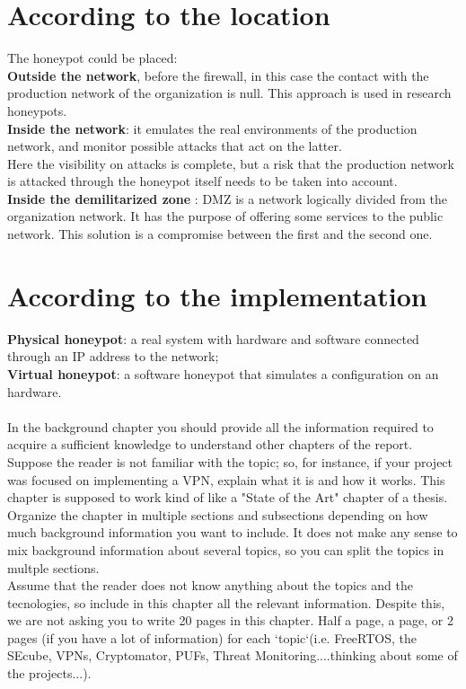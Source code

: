 \section{According to the location}
The honeypot could be placed: \\
\textbf{Outside the network}, before the firewall, in this case the contact with the production network of the organization is null. This approach is used in research honeypots. \\
\textbf{Inside the network}: it emulates the real environments of the production network, and monitor possible attacks that act on the latter. \\
Here the visibility on attacks is complete, but a risk that the production network is attacked through the honeypot itself needs to be taken into account. \\
\textbf{Inside the demilitarized zone} : DMZ is a network logically divided from the organization network. It has the purpose of offering some services to the public network. This solution is a compromise between the first and the second one. 

\section{According to the implementation}
\textbf{Physical honeypot}: a real system with hardware and software connected through an IP address to the network;\\
\textbf{Virtual honeypot}: a software honeypot that simulates a configuration on an hardware.\\\\

In the background chapter you should provide all the information required to acquire a sufficient knowledge to understand other chapters of the report. Suppose the reader is not familiar with the topic; so, for instance, if your project was focused on implementing a VPN, explain what it is and how it works. This chapter is supposed to work kind of like a "State of the Art" chapter of a thesis.\\ Organize the chapter in multiple sections and subsections depending on how much background information you want to include. It does not make any sense to mix background information about several topics, so you can split the topics in multple sections.\\Assume that the reader does not know anything about the topics and the tecnologies, so include in this chapter all the relevant information. Despite this, we are not asking you to write 20 pages in this chapter. Half a page, a page, or 2 pages (if you have a lot of information) for each `topic`(i.e. FreeRTOS, the SEcube, VPNs, Cryptomator, PUFs, Threat Monitoring....thinking about some of the projects...).